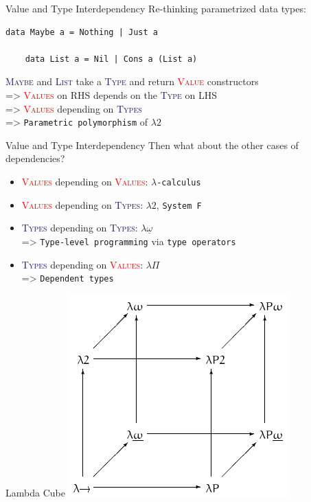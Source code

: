 \documentclass[xcolor={usenames,dvipsnames}]{beamer}
\newcommand{\htycon}[1]{\textcolor{MidnightBlue}{\textsc{#1}}}
\newcommand{\hvalcon}[1]{\textcolor{Red}{\textsc{#1}}}
\begin{document}
\begin{frame}[fragile]{Value and Type Interdependency}
  Re-thinking parametrized data types:
  \begin{lstlisting}[style=hask]
    data Maybe a = Nothing | Just a

    data List a = Nil | Cons a (List a)
  \end{lstlisting}

  \qquad \htycon{Maybe} and \htycon{List} take a \htycon{Type} and return \hvalcon{Value} constructors
  \ \\
  => \hvalcon{Values} on RHS depends on the \htycon{Type} on LHS
  \ \\
  => \hvalcon{Values} depending on \htycon{Types}
  \ \\
  => \texttt{Parametric polymorphism} of $\lambda2$

\end{frame}

\begin{frame}[fragile]{Value and Type Interdependency}
  Then what about the other cases of dependencies?
  \begin{itemize}
    \item \hvalcon{Values} depending on \hvalcon{Values}: \texttt{$\lambda$-calculus}
    \item \hvalcon{Values} depending on \htycon{Types}: $\lambda2$, \texttt{System F}
    \pause
    \item \htycon{Types} depending on \htycon{Types}: $\lambda\underline\omega$\\
      => \texttt{Type-level programming} via \texttt{type operators}
    \pause
    \item \htycon{Types} depending on \hvalcon{Values}: $\lambda\Pi$\\
      => \texttt{Dependent types}
  \end{itemize}
\end{frame}

\begin{frame}[fragile]{Lambda Cube}
  \includegraphics[scale=0.6]{Lambda_cube.png}
\end{frame}
\end{document}
